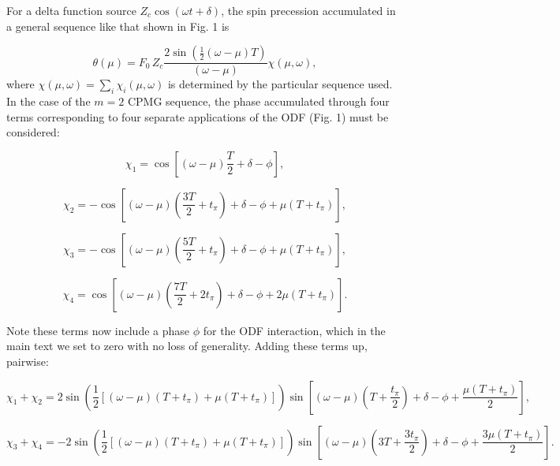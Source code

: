 \documentclass[aps,prl,onecolumn,superscriptaddress,floatfix]{revtex4-1}
\begin{document}
 For a delta function source $Z_c \cos(\omega t+\delta)$, the spin precession accumulated in a general sequence like that shown in Fig. 1 is

\begin{equation}
\theta(\mu) = F_0 \, Z_c \frac{2 \sin \left( \frac{1}{2}\left(\omega-\mu \right)T \right)}{(\omega-\mu)} \chi(\mu,\omega),
\label{}
\end{equation}
where $\chi(\mu,\omega) = \sum_{i} \chi_i(\mu,\omega)$ is determined by the particular sequence used. In the case of the $ m = 2 $ CPMG sequence, the phase accumulated through four terms corresponding to four separate applications of the ODF (Fig. 1) must be considered:

\begin{equation}
\chi_{1} = \cos \left[  \left( \omega - \mu \right) \frac{T}{2}  + \delta-\phi \right],
\end{equation}

\begin{equation}
\chi_{2} = -\cos \left[  \left( \omega - \mu \right) \left( \frac{3T}{2} + t_{\pi} \right) +\delta-\phi +\mu(T+t_{\pi}) \right],
\end{equation}

\begin{equation}
\chi_{3} = -\cos \left[  \left( \omega - \mu \right) \left( \frac{5T}{2} + t_{\pi} \right) +\delta-\phi +\mu(T+t_{\pi}) \right],
\end{equation}

\begin{equation}
\chi_{4} = \cos \left[  \left( \omega - \mu \right) \left( \frac{7T}{2} + 2t_{\pi} \right) +\delta-\phi +2\mu(T+t_{\pi}) \right].
\end{equation}

Note these terms now include a phase $\phi$ for the ODF interaction, which in the main text we set to zero with no loss of generality. Adding these terms up, pairwise:

\begin{equation}
\chi_{1} + \chi_{2} = 2 \sin \left( \frac{1}{2} \left[  \left( \omega - \mu \right) \left( T + t_{\pi} \right) +\mu(T+t_{\pi}) \right] \right) \sin \left[  \left( \omega - \mu \right) \left( T + \frac{t_{\pi}}{2} \right) +\delta-\phi + \frac{\mu(T+t_{\pi})}{2} \right],
\end{equation}

\begin{equation}
\chi_{3} + \chi_{4} = -2 \sin \left( \frac{1}{2} \left[  \left( \omega - \mu \right) \left( T + t_{\pi} \right) +\mu(T+t_{\pi}) \right] \right) \sin \left[  \left( \omega - \mu \right) \left( 3T + \frac{3t_{\pi}}{2} \right) +\delta-\phi + \frac{3\mu(T+t_{\pi})}{2} \right].
\end{equation}
\end{document}
